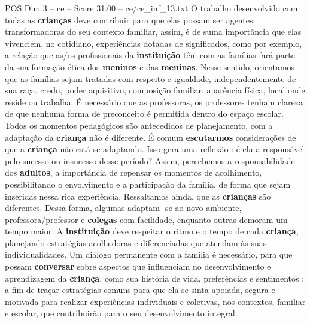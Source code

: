\begin{textsample}{POS Dim 3 – ce – Score 31.00 – ce/ce\_inf\_13.txt}
O trabalho desenvolvido com todas as \textbf{crianças} deve contribuir para que elas possam ser agentes transformadoras do seu contexto familiar, assim, é de suma importância que elas vivenciem, no cotidiano, experiências dotadas de significados, como por exemplo, a relação que as/os profissionais da \textbf{instituição} têm com as famílias fará parte da sua formação ética dos \textbf{meninos} e das \textbf{meninas}.
Nesse sentido, orientamos que as famílias sejam tratadas com respeito e igualdade, independentemente de sua raça, credo, poder aquisitivo, composição familiar, aparência física, local onde reside ou trabalha.
É necessário que as professoras, os professores tenham clareza de que nenhuma forma de preconceito é permitida dentro do espaço escolar.
Todos os momentos pedagógicos são antecedidos de planejamento, com a adaptação da \textbf{criança} não é diferente.
É comum \textbf{escutarmos} considerações de que a \textbf{criança} não está se adaptando.
Isso gera uma reflexão : é ela a responsável pelo sucesso ou insucesso desse período?
Assim, percebemos a responsabilidade dos \textbf{adultos}, a importância de repensar os momentos de acolhimento, possibilitando o envolvimento e a participação da família, de forma que sejam inseridas nessa rica experiência.
Ressaltamos ainda, que as \textbf{crianças} são diferentes.
Dessa forma, algumas adaptam -se ao novo ambiente, professora/professor e \textbf{colegas} com facilidade, enquanto outras demoram um tempo maior.
A \textbf{instituição} deve respeitar o ritmo e o tempo de cada \textbf{criança}, planejando estratégias acolhedoras e diferenciadas que atendam às suas individualidades.
Um diálogo permanente com a família é necessário, para que possam \textbf{conversar} sobre aspectos que influenciam no desenvolvimento e aprendizagem da \textbf{criança}, como sua história de vida, preferências e sentimentos ; a fim de traçar estratégias comuns para que ela se sinta apoiada, segura e motivada para realizar experiências individuais e coletivas, nos contextos, familiar e escolar, que contribuirão para o seu desenvolvimento integral.

\end{textsample}
